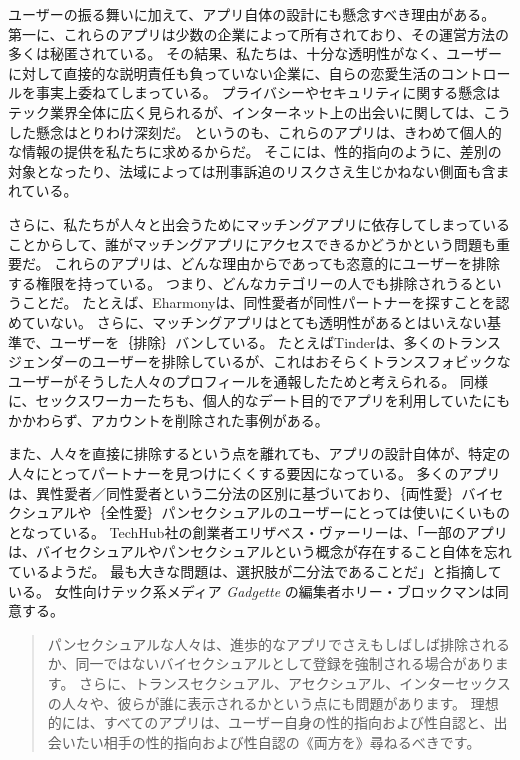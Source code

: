\documentclass[paper=a4,book,openany]{jlreq}
\begin{document}
ユーザーの振る舞いに加えて、アプリ自体の設計にも懸念すべき理由がある。
第一に、これらのアプリは少数の企業によって所有されており、その運営方法の多くは秘匿されている。
その結果、私たちは、十分な透明性がなく、ユーザーに対して直接的な説明責任も負っていない企業に、自らの恋愛生活のコントロールを事実上委ねてしまっている。
プライバシーやセキュリティに関する懸念はテック業界全体に広く見られるが、インターネット上の出会いに関しては、こうした懸念はとりわけ深刻だ。
というのも、これらのアプリは、きわめて個人的な情報の提供を私たちに求めるからだ。
そこには、性的指向のように、差別の対象となったり、法域によっては刑事訴追のリスクさえ生じかねない側面も含まれている。

さらに、私たちが人々と出会うためにマッチングアプリに依存してしまっていることからして、誰がマッチングアプリにアクセスできるかどうかという問題も重要だ。
これらのアプリは、どんな理由からであっても恣意的にユーザーを排除する権限を持っている。
つまり、どんなカテゴリーの人でも排除されうるということだ。
たとえば、Eharmonyは、同性愛者が同性パートナーを探すことを認めていない。
さらに、マッチングアプリはとても透明性があるとはいえない基準で、ユーザーを｛排除｝{バン}している。
たとえばTinderは、多くのトランスジェンダーのユーザーを排除しているが、これはおそらくトランスフォビックなユーザーがそうした人々のプロフィールを通報したためと考えられる\citep{tierney17:_why_are_tran}。
同様に、セックスワーカーたちも、個人的なデート目的でアプリを利用していたにもかかわらず、アカウントを削除された事例がある\citep{al-othman18:_sex_work_say}。

また、人々を直接に排除するという点を離れても、アプリの設計自体が、特定の人々にとってパートナーを見つけにくくする要因になっている。
多くのアプリは、異性愛者／同性愛者という二分法の区別に基づいており、｛両性愛｝{バイセクシュアル}や｛全性愛｝{パンセクシュアル}のユーザーにとっては使いにくいものとなっている。
TechHub社の創業者エリザベス・ヴァーリーは、「一部のアプリは、バイセクシュアルやパンセクシュアルという概念が存在すること自体を忘れているようだ。
最も大きな問題は、選択肢が二分法であることだ」と指摘している。
女性向けテック系メディア \emph{Gadgette} の編集者ホリー・ブロックマンは同意する。

\begin{quote}
  パンセクシュアルな人々は、進歩的なアプリでさえもしばしば排除されるか、同一ではないバイセクシュアルとして登録を強制される場合があります。
さらに、トランスセクシュアル、アセクシュアル、インターセックスの人々や、彼らが誰に表示されるかという点にも問題があります。
理想的には、すべてのアプリは、ユーザー自身の性的指向および性自認と、出会いたい相手の性的指向および性自認の《両方を》尋ねるべきです。
\citep{knowles16:_bisex_prob}
\end{quote}
\end{document}
